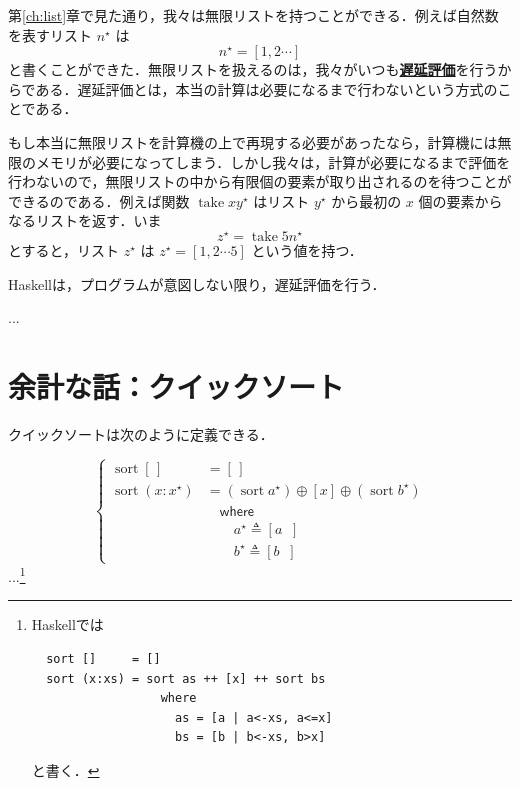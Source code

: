 \documentclass[a4paper,twocolumn]{jsbook}
\newcommand{\programminglanguage}[1]{\textsf{#1}}
\newcommand{\haskell}{\programminglanguage{Haskell}}
\newcommand{\keyword}[1]{{\underline{\textbf{#1}}}}
\newcommand{\mKeyword}[1]{\mathsf{#1}} %
\newcommand{\mWhereKeyword}{\mKeyword{where}}
\newcommand{\mEmptyList}{{[\,]}}
\DeclareMathOperator{\mSort}{sort}
\DeclareMathOperator{\mTake}{take}
\DeclareMathOperator{\mAppend}{\oplus}
\DeclareMathOperator{\mFrom}{\in}
\DeclareMathOperator{\mLetEq}{\triangleq}
\newcommand{\mListWith}[1]{\left[#1\right]}
\newcommand{\mList}[1]{{#1}^\mathrm{\star}}
\newcommand{\mListGuard}[1]{\mathop{\mid_{#1}}}
\begin{document}
第\ref{ch:list}章で見た通り，我々は無限リストを持つことができる．例えば自然数を表すリスト $\mList{n}$ は
\begin{equation}
\mList{n}=\mListWith{1,2\dotsb}
\end{equation}
と書くことができた．無限リストを扱えるのは，我々がいつも\keyword{遅延評価}を行うからである．遅延評価とは，本当の計算は必要になるまで行わないという方式のことである．

もし本当に無限リストを計算機の上で再現する必要があったなら，計算機には無限のメモリが必要になってしまう．しかし我々は，計算が必要になるまで評価を行わないので，無限リストの中から有限個の要素が取り出されるのを待つことができるのである．例えば関数 $\mTake x\mList{y}$ はリスト $\mList{y}$ から最初の $x$ 個の要素からなるリストを返す．いま
\begin{equation}
\mList{z}=\mTake5\mList{n}
\end{equation}
とすると，リスト $\mList{z}$ は $\mList{z}=\mListWith{1,2\dotsb5}$ という値を持つ．

\haskell は，プログラムが意図しない限り，遅延評価を行う．

...

% 

\section{余計な話：クイックソート}

クイックソートは次のように定義できる．

\begin{equation}
\left\{
\begin{align}
\mSort\mEmptyList
  &=\mEmptyList\\
\mSort(x:\mList{x})
  &=(\mSort\mList{a})\mAppend\mListWith{x}\mAppend{}(\mSort\mList{b})\\
&\quad\mWhereKeyword\\
&\qquad\mList{a}\mLetEq\mListWith{a\mListGuard{a\mFrom\mList{x},a\le x}}\\
&\qquad\mList{b}\mLetEq\mListWith{b\mListGuard{b\mFrom\mList{x},b>x}}
\end{align}
\right.
\end{equation}
...\footnote{\haskell では
\begin{verbatim}
  sort []     = []
  sort (x:xs) = sort as ++ [x] ++ sort bs
                  where
                    as = [a | a<-xs, a<=x]
                    bs = [b | b<-xs, b>x]
\end{verbatim}
と書く．
}
\end{document}
